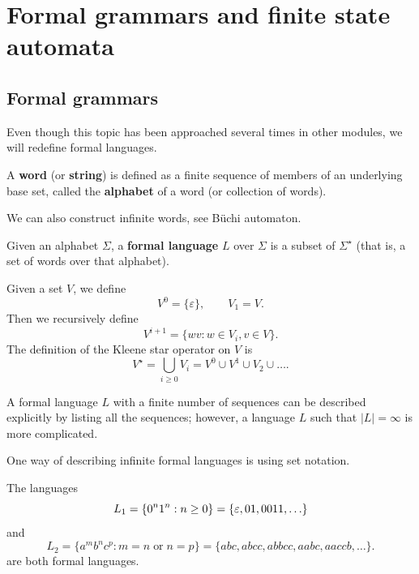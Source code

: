 \chapter{Formal grammars and finite state automata}
\section{Formal grammars}

Even though this topic has been approached several times
in other modules, we will redefine formal languages.

\begin{definition}
    A \textbf{word} (or \textbf{string}) is defined as a finite sequence
    of members of an underlying base set, called the
    \textbf{alphabet} of a word (or collection of words).
\end{definition}

\begin{remark}
    We can also construct infinite words, see B\"uchi automaton.
\end{remark}

\begin{definition}
    Given an alphabet $\Sigma$,
    a \textbf{formal language} $L$ over $\Sigma$ 
    is a subset of $\Sigma^\star$
    (that is, a set of words over that alphabet).
\end{definition}

\begin{remark}
    Given a set $V$, we define
    \[
        V^0 = \{\varepsilon\}, \qquad V_1 = V.
    \]
    Then we recursively define
    \[
        V^{i+1} = \{ wv: w \in V_i, v \in V \}.
    \]
    The definition of the Kleene star operator on $V$ is
    \[
        V^\star = \bigcup_{i \geq 0} V_i = V^0 \cup V^1 \cup V_2 \cup \ldots.
    \]
\end{remark}

A formal language $L$ with a finite number of sequences can be described
explicitly by listing all the sequences; however, a language $L$ such
that $\lvert L \rvert = \infty$ is more complicated.

One way of describing infinite formal languages is using set notation.

\begin{example}
    The languages
    \[
        L_1 = \{0^n1^n : n \geq 0\}
            = \{\varepsilon, 01, 0011, \ldots\} \\
    \]
    and
    \[
        L_2 = \{a^mb^nc^p : m = n \;\text{or}\; n = p\}
            = \{abc, abcc, abbcc, aabc, aaccb, \ldots\}.
    \]
    are both formal languages.
\end{example}


